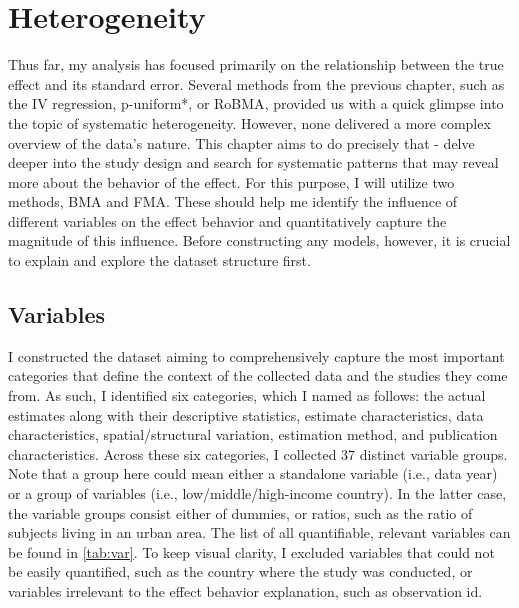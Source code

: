 \chapter{Heterogeneity}
\label{chap:five}

Thus far, my analysis has focused primarily on the relationship between the true effect and its standard error. Several methods from the previous chapter, such as the \ac{IV} regression, p-uniform*, or \ac{RoBMA}, provided us with a quick glimpse into the topic of systematic heterogeneity. However, none delivered a more complex overview of the data's nature. This chapter aims to do precisely that - delve deeper into the study design and search for systematic patterns that may reveal more about the behavior of the effect. For this purpose, I will utilize two methods, \ac{BMA} and \ac{FMA}. These should help me identify the influence of different variables on the effect behavior and quantitatively capture the magnitude of this influence. Before constructing any models, however, it is crucial to explain and explore the dataset structure first.

\section{Variables}
\label{sec:variables}

I constructed the dataset aiming to comprehensively capture the most important categories that define the context of the collected data and the studies they come from. As such, I identified six categories, which I named as follows: the actual estimates along with their descriptive statistics, estimate characteristics, data characteristics, spatial/structural variation, estimation method, and publication characteristics. Across these six categories, I collected 37 distinct variable groups. Note that a group here could mean either a standalone variable (i.e., data year) or a group of variables (i.e., low/middle/high-income country). In the latter case, the variable groups consist either of dummies, or ratios, such as the ratio of subjects living in an urban area. The list of all quantifiable, relevant variables can be found in \autoref{tab:var}. To keep visual clarity, I excluded variables that could not be easily quantified, such as the country where the study was conducted, or variables irrelevant to the effect behavior explanation, such as observation id.

